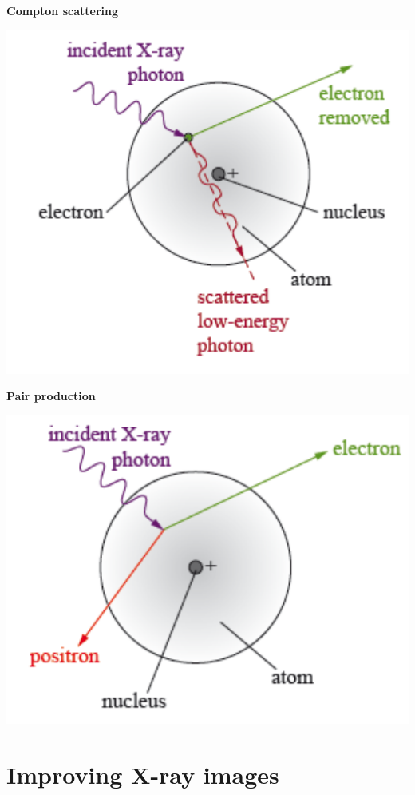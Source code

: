 \documentclass{article}
\begin{document}
{\bf Compton scattering}

\begin{center}
\includegraphics[scale=0.3]{compton}
\end{center}

{\bf Pair production}

\begin{center}
\includegraphics[scale=0.3]{pair_production}
\end{center}

\section{Improving X-ray images}
\end{document}
